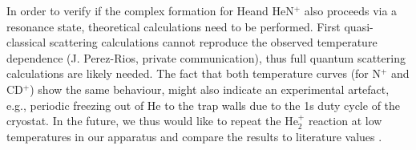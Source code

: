 In order to verify if the complex formation for He\CD and HeN$^+$ also proceeds
via a resonance state, theoretical calculations need to be performed. First
quasi-classical scattering calculations cannot reproduce the observed
temperature dependence (J. Perez-Rios, private communication), thus full quantum
scattering calculations are likely needed. The fact that both temperature
curves (for N$^+$ and CD$^+$) show the same behaviour, might also indicate an
experimental artefact, e.g., periodic freezing out of He to the trap walls due
to the 1s duty cycle of the cryostat. In the future, we thus would like to repeat
the He$_2^+$ reaction at low temperatures in our apparatus and compare the
results to literature values \cite{bohringer_temperature_1983, plasil_stabilization_2012, gerlich_infrared_2018}.

